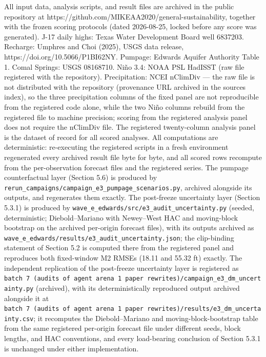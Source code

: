 \documentclass[11pt]{article}
\begin{document}
All input data, analysis scripts, and result files are archived in the
public repository at
https://github.com/MIKEAA2020/general-sustainability, together with the
frozen scoring protocols (dated 2026-08-25, locked before any score was
generated). J-17 daily highs: Texas Water Development Board well
6837203. Recharge: Umphres and Choi (2025), USGS data release,
https://doi.org/10.5066/P1BI62NY. Pumpage: Edwards Aquifer Authority
Table 1. Comal Springs: USGS 08168710. Niño 3.4: NOAA PSL HadISST (raw
file registered with the repository). Precipitation: NCEI nClimDiv ---
the raw file is not distributed with the repository (provenance URL
archived in the sources index), so the three precipitation columns of
the fixed panel are not reproducible from the registered code alone,
while the two Niño columns rebuild from the registered file to machine
precision; scoring from the registered analysis panel does not require
the nClimDiv file. The registered twenty-column analysis panel is the
dataset of record for all scored analyses. All computations are
deterministic: re-executing the registered scripts in a fresh
environment regenerated every archived result file byte for byte, and
all scored rows recompute from the per-observation forecast files and
the registered series. The pumpage counterfactual layer (Section 5.6) is
produced by
\texttt{rerun\_campaigns/campaign\_e3\_pumpage\_scenarios.py}, archived
alongside its outputs, and regenerates them exactly. The post-freeze
uncertainty layer (Section 5.3.1) is produced by
\texttt{wave\_e\_edwards/src/e3\_audit\_uncertainty.py} (seeded,
deterministic; Diebold--Mariano with Newey--West HAC and moving-block
bootstrap on the archived per-origin forecast files), with its outputs
archived as
\texttt{wave\_e\_edwards/results/e3\_audit\_uncertainty.json}; the
clip-binding statement of Section 5.2 is computed there from the
registered panel and reproduces both fixed-window M2 RMSEs (18.11 and
55.32 ft) exactly. The independent replication of the post-freeze
uncertainty layer is registered as
\texttt{batch\ 7\ (audits\ of\ agent\ arena\ 1\ paper\ rewrites)/campaign\_e3\_dm\_uncertainty.py}
(archived), with its deterministically reproduced output archived
alongside it at
\texttt{batch\ 7\ (audits\ of\ agent\ arena\ 1\ paper\ rewrites)/results/e3\_dm\_uncertainty.csv};
it recomputes the Diebold--Mariano and moving-block-bootstrap table from
the same registered per-origin forecast file under different seeds,
block lengths, and HAC conventions, and every load-bearing conclusion of
Section 5.3.1 is unchanged under either implementation.
\end{document}
